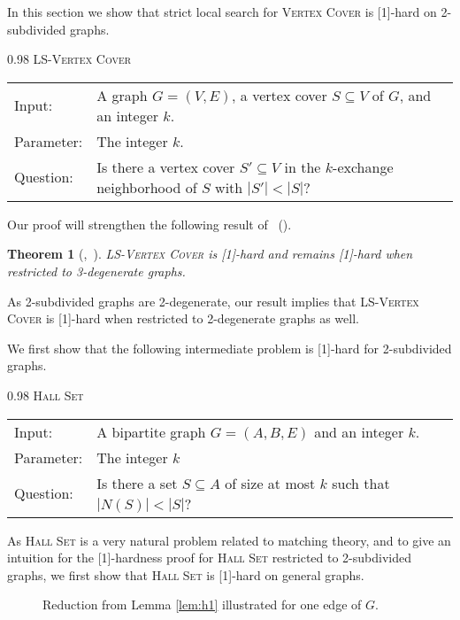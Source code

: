 \documentclass[10pt,usletter]{article}
\newcommand{\W}[1][xxxx]{\text{\normalfont W}[#1]}
\newcommand{\LSVC}{\textsc{LS-Vertex Cover}\xspace}
\newcommand{\HS}{\textsc{Hall Set}\xspace}
\newcommand{\citex}[1]{\citeauthor{#1}~(\citeyear{#1})}
\newcommand{\citey}[1]{\citeauthor{#1},~\citeyear{#1}}
\newtheorem{theorem}{Theorem}
\newcommand{\pbDefP}[4]{\noindent
\begin{center}
\begin{boxedminipage}{0.98 \columnwidth}
#1\\[5pt]
\begin{tabular}{l p{0.70 \columnwidth}}
Input: & #2\\
Parameter: & #3\\
Question: & #4
\end{tabular}
\end{boxedminipage}
\end{center}
}
\begin{document}
In this section we show that strict local search for \textsc{Vertex Cover} is  \W[1]-hard on 2-subdivided graphs.

 \pbDefP{\LSVC}
 {A graph $G=(V,E)$, a vertex cover $S\subseteq V$ of $G$, and an integer $k$.}
 {The integer $k$.}
 {Is there a vertex cover $S' \subseteq V$ in the $k$-exchange neighborhood of $S$ with $|S'|<|S|$?}





Our proof will strengthen the following result of \citex{FellowsRosamondFominLokshtanovSaurabhVillanger09}.

\begin{theorem}[\citey{FellowsRosamondFominLokshtanovSaurabhVillanger09}]
 \LSVC is {\rm \W[1]}-hard and remains {\rm \W[1]}-hard when restricted to 3-degenerate graphs.
\end{theorem}

As 2-subdivided graphs are 2-degenerate, our result implies that \LSVC is \W[1]-hard when restricted to
2-degenerate graphs as well.








We first show that the following intermediate problem is \W[1]-hard for 2-subdivided graphs.

 \pbDefP{\HS}
 {A bipartite graph $G=(A,B,E)$ and an integer $k$.}
 {The integer $k$}
 {Is there a set $S \subseteq A$ of size at most $k$ such that $|N(S)|<|S|$?}

As \HS is a very natural problem related to matching theory,
and to give an intuition for the \W[1]-hardness proof for \HS restricted to 2-subdivided graphs,
we first show that \HS is \W[1]-hard on general graphs.


\begin{figure}[tb]
  \centering
  \caption{\label{fig:h1} Reduction from Lemma \ref{lem:h1} illustrated for one edge of $G$.}
\end{figure}
\end{document}
